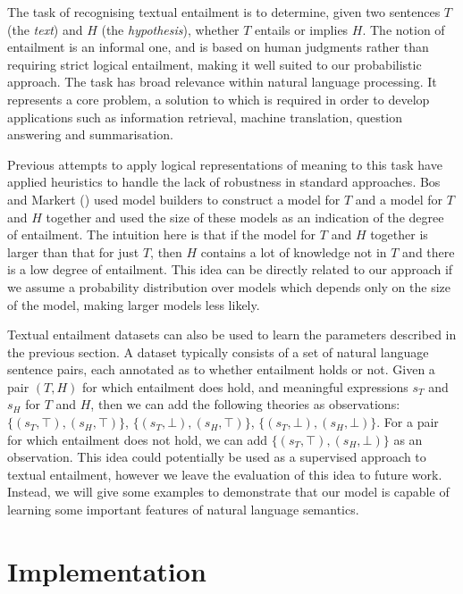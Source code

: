 \documentclass[letterpaper]{article}
\begin{document}
The task of recognising textual entailment \cite{Dagan:05} is to
determine, given two sentences $T$ (the \emph{text}) and $H$ (the
\emph{hypothesis}), whether $T$ entails or implies $H$. The notion of
entailment is an informal one, and is based on human judgments rather
than requiring strict logical entailment, making it well suited to our
probabilistic approach. The task has broad relevance within natural language processing. 
It represents a core problem, a solution to which is required in order to develop applications such as
information retrieval, machine translation, question answering and
summarisation.

Previous attempts to apply logical representations of meaning to this
task have applied heuristics to handle the lack of robustness in
standard approaches. Bos and Markert (\citeyear{Bos:06}) used model
builders to construct a model for $T$ and a model for $T$ and $H$
together and used the size of these models as an indication of the
degree of entailment. The intuition here is that if the model for $T$
and $H$ together is larger than that for just $T$, then $H$
contains a lot of knowledge not in $T$ and there is a low degree of entailment. 
This idea can be
directly related to our approach if we assume a probability distribution over
models which depends only on the size of the model,  making larger
models less likely.

Textual entailment datasets can also be used to learn the parameters
described in the previous section. A dataset typically consists of a
set of natural language sentence pairs, each annotated as to whether
entailment holds or not. Given a pair $(T,H)$ for which entailment
does hold, and meaningful expressions $s_T$ and $s_H$ for $T$ and $H$,
then we can add the following theories as observations:
$\{(s_T,\top),(s_H,\top)\}$, $\{(s_T,\bot),(s_H,\top)\}$,
$\{(s_T,\bot),(s_H,\bot)\}$. For a pair for which entailment does not
hold, we can add $\{(s_T,\top),(s_H,\bot)\}$ as an observation. This
idea could potentially be used as a supervised approach to textual
entailment, however we leave the evaluation of this idea to future
work. Instead, we will give some examples to demonstrate that our
model is capable of learning some important features of natural
language semantics.

\section{Implementation}
\end{document}
